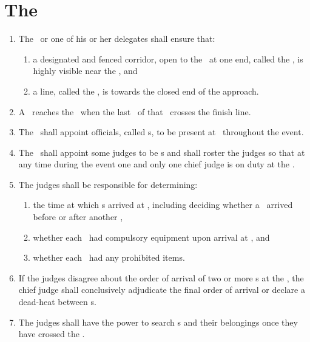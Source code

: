 \documentclass[12pt]{report}
\begin{document}
  \section{The \Endpoint}
  \begin{enumerate}
    \item The \RaceDirector\ or one of his or her delegates shall ensure that:
    \begin{enumerate}
      \item a designated and fenced corridor, open to the \coursearea\ at one end, called the , is highly visible near the \Endpoint, and
      \item a line, called the , is towards the closed end of the approach.
    \end{enumerate}
    \item A \team\ reaches the \Endpoint\ when the last \competitor\ of that \team\ crosses the finish line.
    \item The \RaceDirector\ shall appoint officials, called s, to be present at \Endpoint\ throughout the event.
    \item The \RaceDirector\ shall appoint some judges to be s and shall roster the judges so that at any time during the event one and only one chief judge is on duty at the \Endpoint.
    \item The judges shall be responsible for determining:
    \begin{enumerate}
      \item the time at which \team s arrived at \Endpoint, including deciding whether a \team\ arrived before or after another \team,
      \item whether each \team\ had compulsory equipment upon arrival at \Endpoint, and
      \item whether each \team\ had any prohibited items.
    \end{enumerate}
    \item If the judges disagree about the order of arrival of two or more \team s at the \Endpoint, the chief judge shall conclusively adjudicate the final order of arrival or declare a dead-heat between \team s.
    \item The judges shall have the power to search \competitor s and their belongings once they have crossed the \finishline.
  \end{enumerate}
\end{document}
